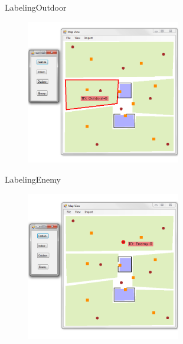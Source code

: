 \begin{frame}{Labeling}{Outdoor}

\begin{figure}
\centering
\includegraphics[width = 0.6\textwidth]{./screenshot/outdoor_label.png}
\end{figure}

\end{frame}

\begin{frame}{Labeling}{Enemy}

\begin{figure}
\centering
\includegraphics[width = 0.6\textwidth]{./screenshot/enemy_label.png}
\end{figure}

\end{frame}